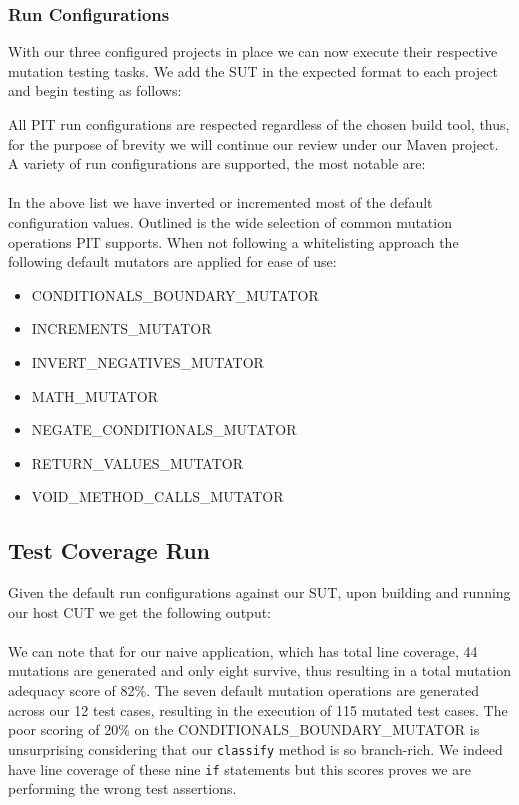 \documentclass[a4paper]{article}
\begin{document}
\subsubsection{Run Configurations}
With our three configured projects in place we can now execute their respective mutation testing tasks. We add the SUT in the expected format to each project and begin testing as follows:

All PIT run configurations are respected regardless of the chosen build tool, thus, for the purpose of brevity we will continue our review under our Maven project. A variety of run configurations are supported, the most notable are:
\\

\\
In the above list we have inverted or incremented most of the default configuration values.  Outlined is the wide selection of common mutation operations PIT supports. When not following a whitelisting approach the following default mutators are applied for ease of use:
\begin{itemize}
  \item CONDITIONALS\_BOUNDARY\_MUTATOR 
  \item INCREMENTS\_MUTATOR
  \item INVERT\_NEGATIVES\_MUTATOR
   \item MATH\_MUTATOR
    \item NEGATE\_CONDITIONALS\_MUTATOR
     \item RETURN\_VALUES\_MUTATOR
      \item VOID\_METHOD\_CALLS\_MUTATOR
\end{itemize}

\subsection{Test Coverage Run}
Given the default run configurations against our SUT, upon building and running our host CUT we get the following output:
 \\

\\
We can note that for our naive application, which has total line coverage, 44 mutations are generated and only eight survive, thus resulting in a total mutation adequacy score of 82\%. The seven default mutation operations are generated across our 12 test cases, resulting in the execution of 115 mutated test cases. The poor scoring of 20\% on the CONDITIONALS\_BOUNDARY\_MUTATOR is unsurprising considering that our  \lstinline$classify$ method is so branch-rich. We indeed have line coverage of these nine \lstinline$if$ statements but this scores proves we are performing the wrong test assertions.
\end{document}
